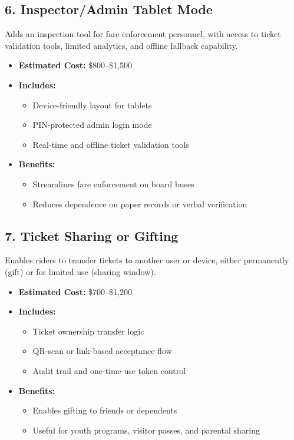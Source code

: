 \documentclass[12pt]{article}
\begin{document}
\subsection*{6. Inspector/Admin Tablet Mode}

Adds an inspection tool for fare enforcement personnel, with access to ticket validation tools, limited analytics, and offline fallback capability.

\begin{itemize}
    \item \textbf{Estimated Cost:} \$800–\$1,500
    \item \textbf{Includes:}
    \begin{itemize}
        \item Device-friendly layout for tablets
        \item PIN-protected admin login mode
        \item Real-time and offline ticket validation tools
    \end{itemize}
    \item \textbf{Benefits:}
    \begin{itemize}
        \item Streamlines fare enforcement on board buses
        \item Reduces dependence on paper records or verbal verification
    \end{itemize}
\end{itemize}

\subsection*{7. Ticket Sharing or Gifting}

Enables riders to transfer tickets to another user or device, either permanently (gift) or for limited use (sharing window).

\begin{itemize}
    \item \textbf{Estimated Cost:} \$700–\$1,200
    \item \textbf{Includes:}
    \begin{itemize}
        \item Ticket ownership transfer logic
        \item QR-scan or link-based acceptance flow
        \item Audit trail and one-time-use token control
    \end{itemize}
    \item \textbf{Benefits:}
    \begin{itemize}
        \item Enables gifting to friends or dependents
        \item Useful for youth programs, visitor passes, and parental sharing
    \end{itemize}
\end{itemize}
\end{document}
